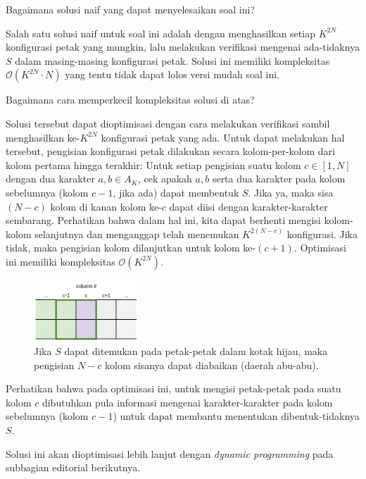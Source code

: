 \documentclass[../main_editorial.tex]{subfiles} %
\newcommand{\bigO}[1]{\mathcal{O}(#1)}
\begin{document}
Bagaimana solusi naif yang dapat menyelesaikan soal ini?

Salah satu solusi naif untuk soal ini adalah dengan menghasilkan setiap $K^{2N}$ konfigurasi petak yang mungkin, lalu melakukan verifikasi mengenai ada-tidaknya $ S $ dalam masing-masing konfigurasi petak. Solusi ini memiliki kompleksitas $ \bigO{K^{2N}\cdot N} $ yang tentu tidak dapat lolos versi mudah soal ini.

Bagaimana cara memperkecil kompleksitas solusi di atas?

Solusi tersebut dapat dioptimisasi dengan cara melakukan verifikasi sambil menghasilkan ke-$ K^{2N} $ konfigurasi petak yang ada. Untuk dapat melakukan hal tersebut, pengisian konfigurasi petak dilakukan secara kolom-per-kolom dari kolom pertama hingga terakhir: Untuk setiap pengisian suatu kolom $ c \in [1, N] $ dengan dua karakter $ a, b \in A_K $, cek apakah $ a, b $ serta dua karakter pada kolom sebelumnya (kolom $ c - 1 $, jika ada) dapat membentuk $ S $. Jika ya, maka sisa $ (N-c) $ kolom di kanan kolom ke-$ c $ dapat diisi dengan karakter-karakter sembarang. Perhatikan bahwa dalam hal ini, kita dapat berhenti mengisi kolom-kolom selanjutnya dan menganggap telah menemukan $ K^{2(N-c)} $ konfigurasi. Jika tidak, maka pengisian kolom dilanjutkan untuk kolom ke-$ (c + 1) $. Optimisasi ini memiliki kompleksitas $ \bigO{K^{2N}} $.

\begin{figure}[!h]
	\centering
	\includegraphics[width=0.35\textwidth]{scrabble/imgs/scrabble-per-column}
		\captionsetup{width=0.8\textwidth}
	\caption{Jika $ S $ dapat ditemukan pada petak-petak dalam kotak hijau, maka pengisian $ N-c $ kolom sisanya dapat diabaikan (daerah abu-abu).}
\end{figure}

Perhatikan bahwa pada optimisasi ini, untuk mengisi petak-petak pada suatu kolom $ c $ dibutuhkan pula informasi mengenai karakter-karakter pada kolom sebelumnya (kolom $ c - 1 $) untuk dapat membantu menentukan dibentuk-tidaknya $ S $.

Solusi ini akan dioptimisasi lebih lanjut dengan \textit{dynamic programming} pada subbagian editorial berikutnya.
\end{document}
